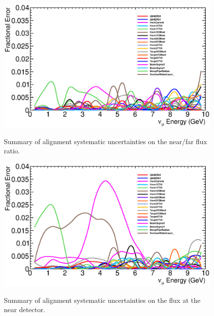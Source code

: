 \begin{figure}[ht]
  \begin{center}
    {\includegraphics[width=6.0in]{figures/error_summary_nof.eps}}
  \end{center}
\caption{ Summary of alignment systematic uncertainties on the near/far flux ratio.}
\end{figure}

\begin{figure}[ht]
  \begin{center}
    {\includegraphics[width=6.0in]{figures/error_summary_near.eps}}
  \end{center}
\caption{ Summary of alignment systematic uncertainties on the flux at the near detector.}
\end{figure}

